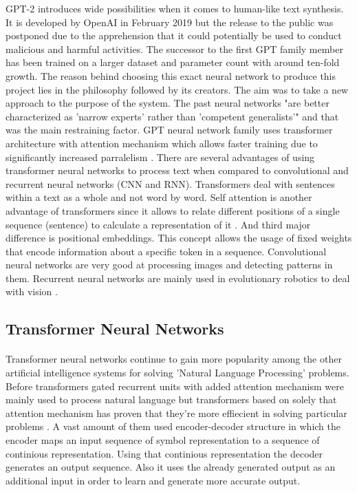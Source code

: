 \documentclass[12pt]{report}
\begin{document}
    GPT-2 introduces wide possibilities when it comes to human-like text synthesis. It is developed by OpenAI in February 2019 but the
    release to the public was postponed due to the apprehension that it could potentially be used to conduct malicious and harmful activities. The successor to
    the first GPT family member has been trained on a larger dataset and parameter count with around ten-fold growth. The reason behind
    choosing this exact neural network to produce this project lies in the philosophy followed by its creators. The aim was to take a new approach to the purpose of the system.
    The past neural networks "are better characterized as 'narrow experts' rather than  'competent generalists'" \citep{radford_wu_child_luan_amodei_sutskever_2019} and that was
    the main restraining factor. GPT neural network family uses transformer architecture with attention mechanism which allows faster training due to significantly increased parralelism \citep{attention_is_all_you_need}.
    There are several advantages of using transformer neural networks to process text when compared to convolutional and recurrent neural networks (CNN and RNN). Transformers deal with sentences within a text as a whole and not word by word.
    Self attention is another advantage of transformers since it allows to relate different positions of a single sequence (sentence) to calculate a representation of it \citep{attention_is_all_you_need}.
    And third major difference is positional embeddings. This concept allows the usage of fixed weights that encode information about a specific token in a sequence.
    Convolutional neural networks are very good at processing images and detecting patterns in them. Recurrent neural networks are mainly used in evolutionary robotics to deal with vision \citep{inproceedings}.
    
    
    \clearpage

    \subsection*{Transformer Neural Networks}
    \paragraph{}

    Transformer neural networks continue to gain more popularity among the other artificial intelligence systems for solving 'Natural Language Processing' problems.
    Before transformers gated recurrent units with added attention mechanism were mainly used to process natural language but transformers based on solely that attention mechanism
    has proven that they're more effiecient in solving particular problems \citep{attention_is_all_you_need}. A vast amount of them used encoder-decoder structure in which the encoder maps
    an input sequence of symbol representation to a sequence of continious representation. Using that continious representation the decoder generates an output sequence. Also it uses the
    already generated output as an additional input in order to learn and generate more accurate output.
\end{document}
